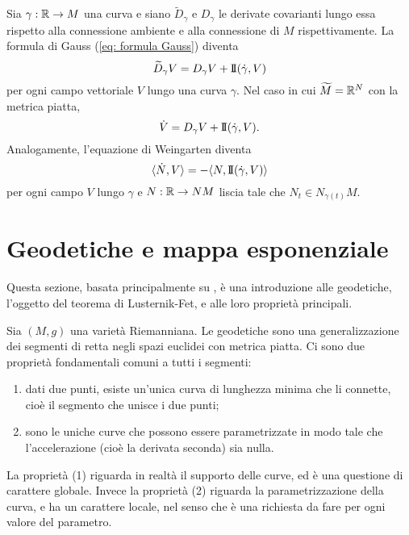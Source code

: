 	\begin{oss}
		Sia \(\gamma:\mathbb{R} \to M\) una curva e siano \(\widetilde{D}_\gamma\) e \(D_\gamma\) le derivate covarianti lungo essa rispetto alla connessione ambiente e alla connessione di \(M\) rispettivamente. La formula di Gauss (\ref{eq: formula Gauss}) diventa
		\begin{equation}
			\widetilde{D}_\gamma V  = D_\gamma V + \mathrm{I\!I}(\dot \gamma, V)
		\end{equation}
		per ogni campo vettoriale \(V\) lungo una curva \(\gamma\). Nel caso in cui \(\widetilde{M}=\mathbb{R}^N\) con la metrica piatta, 
		\begin{equation}\label{eq: formula Gauss curve in M in R^N}
			\dot V  = D_\gamma V + \mathrm{I\!I}(\dot \gamma, V).
		\end{equation}
		Analogamente, l'equazione di Weingarten diventa
		\begin{equation}\label{eq: Weingarten curve in M in R^N}
			\langle \dot N, V \rangle = - \langle N, \mathrm{I\!I}(\dot \gamma,V) \rangle 
		\end{equation}
		per ogni campo \(V\) lungo \(\gamma\) e \(N:\mathbb{R} \to NM\) liscia tale che \(N_t \in N_{\gamma(t)}M\). 
	\end{oss}
	

	
	\section{Geodetiche e mappa esponenziale}
	
	Questa sezione, basata principalmente su \cite[Chapter 10]{milnor1963morse}, è una introduzione alle geodetiche, l'oggetto del teorema di Lusternik-Fet, e alle loro proprietà principali. 
	
	Sia \((M,g)\) una varietà Riemanniana. Le geodetiche sono una generalizzazione dei segmenti di retta negli spazi euclidei con metrica piatta. Ci sono due proprietà fondamentali comuni a tutti i segmenti:
	\begin{enumerate}[label=(\arabic*)]
		\item dati due punti, esiste un'unica curva di lunghezza minima che li connette, cioè il segmento che unisce i due punti;
		\item sono le uniche curve che possono essere parametrizzate in modo tale che l'accelerazione (cioè la derivata seconda) sia nulla.
	\end{enumerate}
	La proprietà (1) riguarda in realtà il supporto delle curve, ed è una questione di carattere globale. Invece la proprietà (2) riguarda la parametrizzazione della curva, e ha un carattere locale, nel senso che è una richiesta da fare per ogni valore del parametro. 
	
